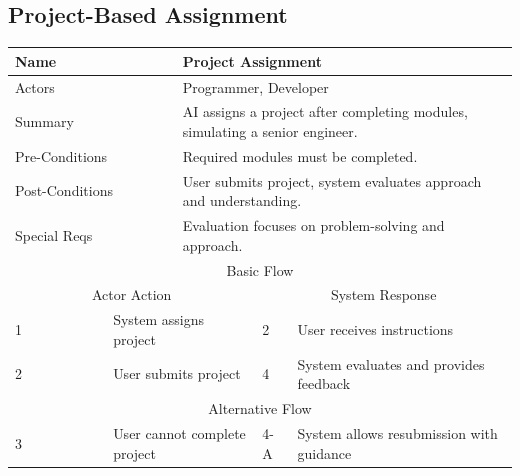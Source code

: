 \documentclass{FastFyp}
\begin{document}
\vspace{1em}

\subsection{Project-Based Assignment}
\noindent
\begin{minipage}{\textwidth}
\centering
{}
\label{tab:project}
\begin{tabular}{|p{}|p{}|p{}|p{}|p{}|}
\hline
\multicolumn{2}{|p{0.15\textwidth}|}{Name} &
  \multicolumn{3}{p{0.75\textwidth}|}{Project Assignment} \\ \hline
\multicolumn{2}{|p{0.15\textwidth}|}{Actors} &
  \multicolumn{3}{p{0.75\textwidth}|}{Programmer, Developer} \\ \hline
\multicolumn{2}{|p{0.15\textwidth}|}{Summary} &
  \multicolumn{3}{p{0.75\textwidth}|}{AI assigns a project after completing modules, simulating a senior engineer.} \\ \hline
\multicolumn{2}{|p{0.15\textwidth}|}{Pre-Conditions} &
  \multicolumn{3}{p{0.75\textwidth}|}{Required modules must be completed.} \\ \hline
\multicolumn{2}{|p{0.15\textwidth}|}{Post-Conditions} &
  \multicolumn{3}{p{0.75\textwidth}|}{User submits project, system evaluates approach and understanding.} \\ \hline
\multicolumn{2}{|p{0.15\textwidth}|}{Special Reqs} &
  \multicolumn{3}{p{0.75\textwidth}|}{Evaluation focuses on problem-solving and approach.} \\ \hline
\multicolumn{5}{|c|}{Basic Flow} \\ \hline
\multicolumn{3}{|c|}{Actor Action} &
  \multicolumn{2}{c|}{System Response} \\ \hline
1 &
  \multicolumn{2}{p{0.42\textwidth}|}{System assigns project} &
  2 &
  User receives instructions \\ \hline
2 &
  \multicolumn{2}{p{0.42\textwidth}|}{User submits project} &
  4 &
  System evaluates and provides feedback \\ \hline
\multicolumn{5}{|c|}{Alternative Flow} \\ \hline
3 &
  \multicolumn{2}{p{0.42\textwidth}|}{User cannot complete project} &
  4-A &
  System allows resubmission with guidance \\ \hline
\end{tabular}
\end{minipage}
\end{document}
